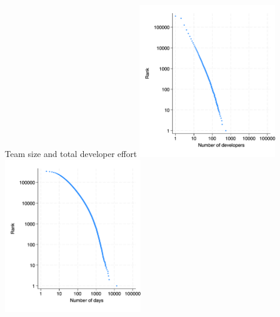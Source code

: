 \documentclass[
  ignorenonframetext,
  aspectratio=169,
]{beamer}
\begin{document}
\begin{frame}{Team size and total developer effort}
\protect\hypertarget{team-size-and-total-developer-effort}{}
\includegraphics[width=0.45\textwidth,height=\textheight]{figures/developers_rank.png}
\includegraphics[width=0.45\textwidth,height=\textheight]{figures/days_rank.png}
\end{frame}
\end{document}
